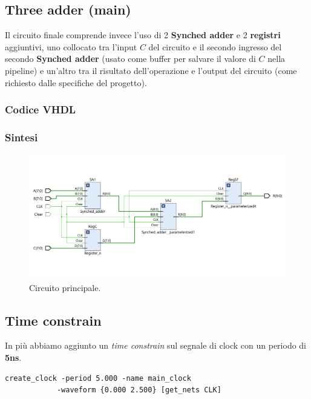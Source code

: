 \documentclass[12pt]{article}
\begin{document}
    \subsection{Three adder (main)}
        Il circuito finale comprende invece l'uso di 2 \textbf{Synched adder} e 2 \textbf{registri} aggiuntivi, uno collocato tra l'input $C$ del circuito e il secondo ingresso del secondo \textbf{Synched adder} (usato come buffer per salvare il valore di $C$ nella pipeline) e un'altro tra il risultato dell'operazione e l'output del circuito (come richiesto dalle specifiche del progetto).

        \subsubsection{Codice VHDL}
            
        \newpage
        
        \subsubsection{Sintesi}
            \begin{figure}[ht]
                \centering
                \includegraphics[scale=0.55]{main.png}
                \caption{Circuito principale.}
            \end{figure}

    \subsection{Time constrain}
        In più abbiamo aggiunto un \textit{time constrain} sul segnale di clock con un periodo di \textbf{5ns}.

        \begin{lstlisting}[basicstyle=\footnotesize]
            create_clock -period 5.000 -name main_clock
            -waveform {0.000 2.500} [get_nets CLK]
        \end{lstlisting}
\end{document}
